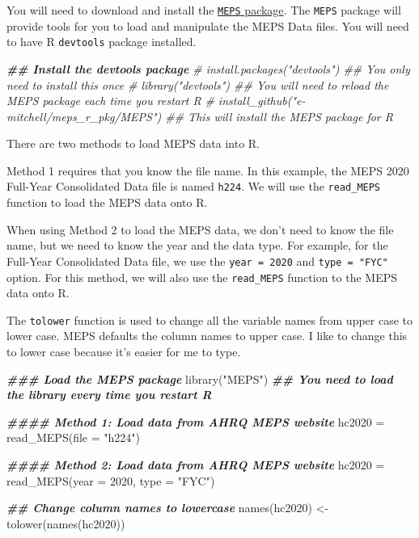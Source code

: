 \documentclass[
]{book}
\newenvironment{Shaded}{\begin{snugshade}}{\end{snugshade}}
\newcommand{\AttributeTok}[1]{\textcolor[rgb]{0.77,0.63,0.00}{#1}}
\newcommand{\CommentTok}[1]{\textcolor[rgb]{0.56,0.35,0.01}{\textit{#1}}}
\newcommand{\DecValTok}[1]{\textcolor[rgb]{0.00,0.00,0.81}{#1}}
\newcommand{\DocumentationTok}[1]{\textcolor[rgb]{0.56,0.35,0.01}{\textbf{\textit{#1}}}}
\newcommand{\FunctionTok}[1]{\textcolor[rgb]{0.00,0.00,0.00}{#1}}
\newcommand{\NormalTok}[1]{#1}
\newcommand{\OtherTok}[1]{\textcolor[rgb]{0.56,0.35,0.01}{#1}}
\newcommand{\StringTok}[1]{\textcolor[rgb]{0.31,0.60,0.02}{#1}}
\theoremstyle{definition}
\theoremstyle{definition}
\theoremstyle{definition}
\theoremstyle{definition}
\theoremstyle{remark}
\begin{document}
You will need to download and install the \href{https://github.com/e-mitchell/meps_r_pkg}{\texttt{MEPS} package}. The \texttt{MEPS} package will provide tools for you to load and manipulate the MEPS Data files. You will need to have R \texttt{devtools} package installed.

\begin{Shaded}
\begin{Highlighting}[]
\DocumentationTok{\#\# Install the devtools package}
\CommentTok{\# install.packages("devtools") \#\# You only need to install this once}
\CommentTok{\# library("devtools")  \#\# You will need to reload the MEPS package each time you restart R}
\CommentTok{\# install\_github("e{-}mitchell/meps\_r\_pkg/MEPS") \#\# This will install the MEPS package for R}
\end{Highlighting}
\end{Shaded}

There are two methods to load MEPS data into R.

Method 1 requires that you know the file name. In this example, the MEPS 2020 Full-Year Consolidated Data file is named \texttt{h224}. We will use the \texttt{read\_MEPS} function to load the MEPS data onto R.

When using Method 2 to load the MEPS data, we don't need to know the file name, but we need to know the year and the data type. For example, for the Full-Year Consolidated Data file, we use the \texttt{year\ =\ 2020} and \texttt{type\ =\ "FYC"} option. For this method, we will also use the \texttt{read\_MEPS} function to the MEPS data onto R.

The \texttt{tolower} function is used to change all the variable names from upper case to lower case. MEPS defaults the column names to upper case. I like to change this to lower case because it's easier for me to type.

\begin{Shaded}
\begin{Highlighting}[]
\DocumentationTok{\#\#\# Load the MEPS package}
\FunctionTok{library}\NormalTok{(}\StringTok{"MEPS"}\NormalTok{) }\DocumentationTok{\#\# You need to load the library every time you restart R}

\DocumentationTok{\#\#\#\# Method 1: Load data from AHRQ MEPS website}
\NormalTok{hc2020 }\OtherTok{=} \FunctionTok{read\_MEPS}\NormalTok{(}\AttributeTok{file =} \StringTok{"h224"}\NormalTok{)}

\DocumentationTok{\#\#\#\# Method 2: Load data from AHRQ MEPS website}
\NormalTok{hc2020 }\OtherTok{=} \FunctionTok{read\_MEPS}\NormalTok{(}\AttributeTok{year =} \DecValTok{2020}\NormalTok{, }\AttributeTok{type =} \StringTok{"FYC"}\NormalTok{)}

\DocumentationTok{\#\# Change column names to lowercase}
\FunctionTok{names}\NormalTok{(hc2020) }\OtherTok{\textless{}{-}} \FunctionTok{tolower}\NormalTok{(}\FunctionTok{names}\NormalTok{(hc2020))}
\end{Highlighting}
\end{Shaded}
\end{document}
